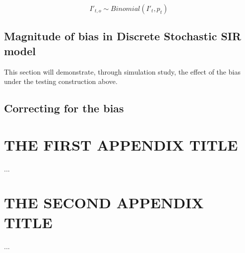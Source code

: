 \documentclass{umassthesis}          %
\begin{document}
\begin{equation}
I'_{t,o} \sim Binomial(I'_t,p_t)	
\end{equation}


\section{Magnitude of bias in Discrete Stochastic SIR model}

This section will demonstrate, through simulation study, the effect of the bias under the testing construction above. 


\section{Correcting for the bias}




\appendix
\chapter{THE FIRST APPENDIX TITLE}
...
\chapter{THE SECOND APPENDIX TITLE}
...

\backmatter  %




\end{document}
